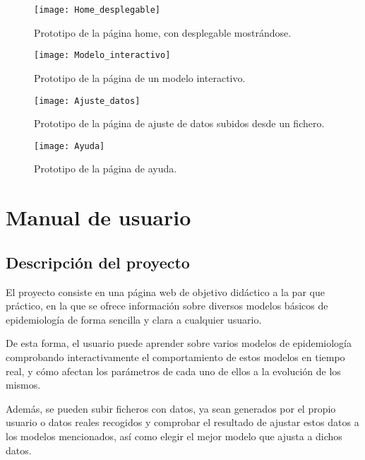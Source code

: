 \begin{figure}
\begin{center}
\caption{Prototipo de la página home, con desplegable mostrándose.}
\label{wire: home_desplegable}
\texttt{[image: Home\_desplegable]}
\end{center}
\end{figure}

\begin{figure}
\begin{center}
\caption{Prototipo de la página de un modelo interactivo.}
\label{wire: modelo_interactivo}
\texttt{[image: Modelo\_interactivo]}
\end{center}
\end{figure}

\begin{figure}
\begin{center}
\caption{Prototipo de la página de ajuste de datos subidos desde un fichero.}
\label{wire: ajuste}
\texttt{[image: Ajuste\_datos]}
\end{center}
\end{figure}

\begin{figure}
\begin{center}
\caption{Prototipo de la página de ayuda.}
\label{wire: ayuda}
\texttt{[image: Ayuda]}
\end{center}
\end{figure}

\section{Manual de usuario}

\subsection{Descripción del proyecto}

El proyecto consiste en una página web de objetivo didáctico a la par que práctico, en la que se ofrece información sobre diversos modelos básicos de epidemiología de forma sencilla y clara a cualquier usuario.

De esta forma, el usuario puede aprender sobre varios modelos de epidemiología comprobando interactivamente el comportamiento de estos modelos en tiempo real, y cómo afectan los parámetros de cada uno de ellos a la evolución de los mismos.

Además, se pueden subir ficheros con datos, ya sean generados por el propio usuario o datos reales recogidos y comprobar el resultado de ajustar estos datos a los modelos mencionados, así como elegir el mejor modelo que ajusta a dichos datos.

